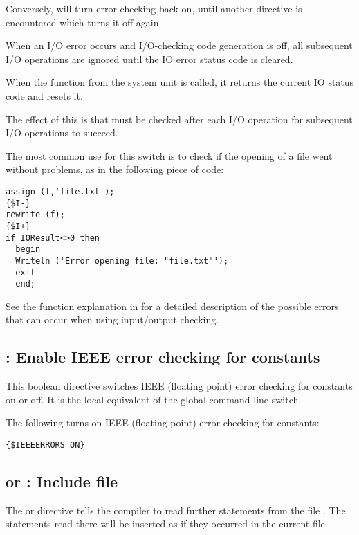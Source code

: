 Conversely,  will turn error-checking back on, until another
directive is encountered which turns it off again.

\begin{remark}
When an I/O error occurs and I/O-checking code generation is off, all subsequent 
I/O operations are ignored until the IO error status code is cleared. 

When the  function from the system unit is called, it returns the
current IO status code and resets it.

The effect of this is that  must be checked after each I/O
operation for subsequent I/O operations to succeed.
\end{remark}

The most common use for this switch is to check if the opening of a file
went without problems, as in the following piece of code:
\begin{verbatim}
assign (f,'file.txt');
{$I-}
rewrite (f);
{$I+}
if IOResult<>0 then
  begin
  Writeln ('Error opening file: "file.txt"');
  exit
  end;
\end{verbatim}
See the  function explanation in  for a
detailed description of the possible errors that can occur when using
input/output checking.

\subsection{ : Enable IEEE error checking for constants }
This boolean directive switches IEEE (floating point) error checking for constants on
or off. It is the local equivalent of the global  command-line switch.

The following turns on IEEE (floating point) error checking for constants:
\begin{verbatim}
{$IEEEERRORS ON}
\end{verbatim}

\subsection{ or  : Include file }

The  or  directive
tells the compiler to read further statements from the file .
The statements read there will be inserted as if they occurred in the
current file.

